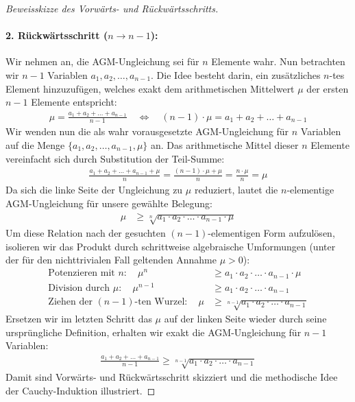 \documentclass{article}
\theoremstyle{definition}
\begin{document}
\begin{proof}[Beweisskizze des Vorwärts- und Rückwärtsschritts]
\paragraph{2. Rückwärtsschritt ($n \rightarrow n-1$):}
Wir nehmen an, die AGM-Ungleichung sei für $n$ Elemente wahr. Nun betrachten wir $n-1$ Variablen $a_1, a_2, \dots, a_{n-1}$. Die Idee besteht darin, ein zusätzliches $n$-tes Element hinzuzufügen, welches exakt dem arithmetischen Mittelwert $\mu$ der ersten $n-1$ Elemente entspricht:
\begin{align*}
    \mu = \frac{a_1 + a_2 + \dots + a_{n-1}}{n-1} \quad \Longleftrightarrow \quad (n-1)\cdot\mu = a_1 + a_2 + \dots + a_{n-1}
\end{align*}
Wir wenden nun die als wahr vorausgesetzte AGM-Ungleichung für $n$ Variablen auf die Menge $\{a_1, a_2, \dots, a_{n-1}, \mu\}$ an. Das arithmetische Mittel dieser $n$ Elemente vereinfacht sich durch Substitution der Teil-Summe:
\begin{align*}
    \frac{a_1 + a_2 + \dots + a_{n-1} + \mu}{n} = \frac{(n-1)\cdot\mu + \mu}{n} = \frac{n\cdot\mu}{n} = \mu
\end{align*}
Da sich die linke Seite der Ungleichung zu $\mu$ reduziert, lautet die $n$-elementige AGM-Ungleichung für unsere gewählte Belegung:
\begin{align*}
    \mu &\ge \sqrt[n]{a_1 \cdot a_2 \cdot \dots \cdot a_{n-1} \cdot \mu}
\end{align*}
Um diese Relation nach der gesuchten $(n-1)$-elementigen Form aufzulösen, isolieren wir das Produkt durch schrittweise algebraische Umformungen (unter der für den nichttrivialen Fall geltenden Annahme $\mu > 0$):
\begin{align*}
    \text{Potenzieren mit } n: \quad \mu^n &\ge a_1 \cdot a_2 \cdot \dots \cdot a_{n-1} \cdot \mu \\
    \text{Division durch } \mu: \quad \mu^{n-1} &\ge a_1 \cdot a_2 \cdot \dots \cdot a_{n-1} \\
    \text{Ziehen der } (n-1)\text{-ten Wurzel}: \quad \mu &\ge \sqrt[n-1]{a_1 \cdot a_2 \cdot \dots \cdot a_{n-1}}
\end{align*}
Ersetzen wir im letzten Schritt das $\mu$ auf der linken Seite wieder durch seine ursprüngliche Definition, erhalten wir exakt die AGM-Ungleichung für $n-1$ Variablen:
\begin{align*}
    \frac{a_1 + a_2 + \dots + a_{n-1}}{n-1} \ge \sqrt[n-1]{a_1 \cdot a_2 \cdot \dots \cdot a_{n-1}}
\end{align*}
Damit sind Vorwärts- und Rückwärtsschritt skizziert und die methodische Idee der Cauchy-Induktion illustriert.
\end{proof}
\end{document}
